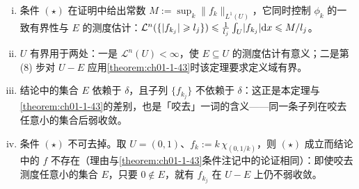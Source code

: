 \documentclass[../../main.tex]{subfiles}%
\begin{document}
\begin{remark}\label{remark:ch01-thm-1-44-条件}
\begin{enumerate}[(i)]
\item 条件 $(\star)$ 在证明中给出常数 $M:=\sup_k\lVert f_k\rVert_{L^1(U)}$，它同时控制 $\phi_k$ 的一致有界性与 $E$ 的测度估计：$\mathcal{L}^n(\{\lvert f_{k_j}\rvert\geqslant l_j\})\leqslant\frac{1}{l_j}\int_U\lvert f_{k_j}\rvert\mathrm{d} x\leqslant M/l_j$。
\item $U$ 有界用于两处：一是 $\mathcal{L}^n(U)<\infty$，使 $E\subseteq U$ 的测度估计有意义；二是第 (8) 步对 $U-E$ 应用\cref{theorem:ch01-1-43}时该定理要求定义域有界。%
\item 结论中的集合 $E$ 依赖于 $\delta$，且子列 $\{f_{k_j}\}$ 不依赖于 $\delta$：这正是本定理与\cref{theorem:ch01-1-43}的差别，也是「咬去」一词的含义——同一条子列在咬去任意小的集合后弱收敛。%
\item 条件 $(\star)$ 不可去掉。取 $U=(0,1)$、$f_k:=k\,\chi_{(0,1/k)}$，则 $(\star)$ 成立而结论中的 $f$ 不存在（理由与\cref{theorem:ch01-1-43}条件注记中的论证相同）：即使咬去测度任意小的集合 $E$，只要 $0\notin E$，就有 $f_{k_j}$ 在 $U-E$ 上仍不弱收敛。%
\end{enumerate}
\end{remark}
\end{document}
